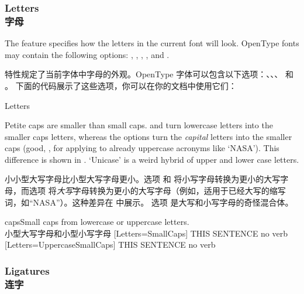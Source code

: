 \documentclass[a4paper]{l3doc}
\begin{document}
\subsubsection{Letters\\字母} \label{sec:letters}
The  feature specifies how the letters in the current font
will look. OpenType fonts may contain the following options:
, ,
, , and
.

 特性规定了当前字体中字母的外观。OpenType 字体可以包含以下选项：、、、 和 。
下面的代码展示了这些选项，你可以在你的文档中使用它们：

\begin{features}{Letters}
\end{features}

Petite caps are smaller than small caps.
 and 
turn lowercase letters into the smaller caps letters,
whereas the  options turn the \emph{capital} letters into
the smaller
caps (good, \eg, for applying to already uppercase acronyms like
`NASA').
This difference is shown in .
`Unicase' is a weird hybrid of upper and lower case letters.

小小型大写字母比小型大写字母更小。选项  和  将小写字母转换为更小的大写字母，而选项  将\emph{大写}字母转换为更小的大写字母（例如，适用于已经大写的缩写词，如“NASA”）。这种差异在  中展示。
选项  是大写和小写字母的奇怪混合体。

\begin{Lexample}{caps}{Small caps from lowercase or uppercase letters.\\小型大写字母和小型小写字母}
  [Letters=SmallCaps]
   THIS SENTENCE no verb                \\
  [Letters=UppercaseSmallCaps]
   THIS SENTENCE no verb
\end{Lexample}

\subsubsection{Ligatures\\连字}
\label{sec:ot-feat-liga}
\end{document}
